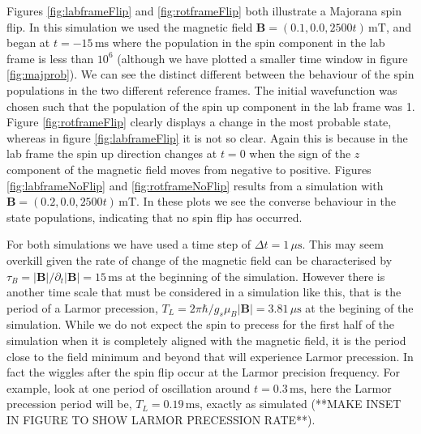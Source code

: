 Figures \ref{fig:labframeFlip} and \ref{fig:rotframeFlip} both illustrate a Majorana spin flip.
In this simulation we used the magnetic field $\mathbf{B}=(0.1,0.0,2500t)\,\mathrm{mT}$, and began at $t=-15\,\mathrm{ms}$ where the population in the spin component in the lab frame is less than $10^6$ (although we have plotted a smaller time window in figure \ref{fig:majprob}).
We can see the distinct different between the behaviour of the spin populations in the two different reference frames.
The initial wavefunction was chosen such that the population of the spin up component in the lab frame was 1.
Figure \ref{fig:rotframeFlip} clearly displays a change in the most probable state, whereas in figure \ref{fig:labframeFlip} it is not so clear.
Again this is because in the lab frame the spin up direction changes at $t=0$ when the sign of the $z$ component of the magnetic field moves from negative to positive.
Figures \ref{fig:labframeNoFlip} and \ref{fig:rotframeNoFlip} results from a simulation with $\mathbf{B}=(0.2,0.0,2500t)\,\mathrm{mT}$.
In these plots we see the converse behaviour in the state populations, indicating that no spin flip has occurred.

For both simulations we have used a time step of $\Delta t = 1\,\mu\mathrm{s}$.
This may seem overkill given the rate of change of the magnetic field can be characterised by $\tau_B=\vert\mathbf{B}\vert / \partial_t\vert\mathbf{B}\vert = 15\,\mathrm{ms}$ at the beginning of the simulation.
However there is another time scale that must be considered in a simulation like this, that is the period of a Larmor precession, $T_L = 2\pi\hbar / g_s \mu_B \vert\mathbf{B}\vert = 3.81\,\mu\mathrm{s}$ at the begining of the simulation.
While we do not expect the spin to precess for the first half of the simulation when it is completely aligned with the magnetic field, it is the period close to the field minimum and beyond that will experience Larmor precession.
In fact the wiggles after the spin flip occur at the Larmor precision frequency.
For example, look at one period of oscillation around $t=0.3\,\mathrm{ms}$, here the Larmor precession period will be, $T_L=0.19\,\mathrm{ms}$, exactly as simulated (**MAKE INSET IN FIGURE TO SHOW LARMOR PRECESSION RATE**).


